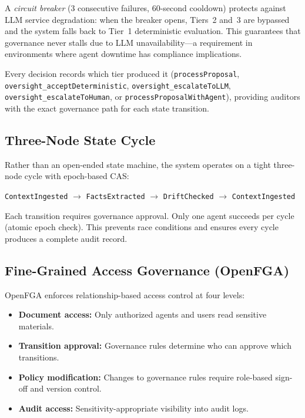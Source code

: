 \documentclass[11pt]{article}
\begin{document}
A \emph{circuit breaker} (3 consecutive failures, 60-second cooldown) protects against LLM service degradation: when the breaker opens, Tiers~2 and~3 are bypassed and the system falls back to Tier~1 deterministic evaluation. This guarantees that governance never stalls due to LLM unavailability---a requirement in environments where agent downtime has compliance implications.

Every decision records which tier produced it (\texttt{processProposal}, \texttt{oversight\_acceptDeterministic}, \texttt{oversight\_escalateToLLM}, \texttt{oversight\_escalateToHuman}, or \texttt{processProposalWithAgent}), providing auditors with the exact governance path for each state transition.

\subsection{Three-Node State Cycle}

Rather than an open-ended state machine, the system operates on a tight three-node cycle with epoch-based CAS:

\begin{center}
\texttt{ContextIngested} $\rightarrow$ \texttt{FactsExtracted} $\rightarrow$ \texttt{DriftChecked} $\rightarrow$ \texttt{ContextIngested}
\end{center}

Each transition requires governance approval. Only one agent succeeds per cycle (atomic epoch check). This prevents race conditions and ensures every cycle produces a complete audit record.

\subsection{Fine-Grained Access Governance (OpenFGA)}
\label{sec:openfga}

OpenFGA \cite{pang2019} enforces relationship-based access control at four levels:

\begin{itemize}
  \item \textbf{Document access:} Only authorized agents and users read sensitive materials.
  \item \textbf{Transition approval:} Governance rules determine who can approve which transitions.
  \item \textbf{Policy modification:} Changes to governance rules require role-based sign-off and version control.
  \item \textbf{Audit access:} Sensitivity-appropriate visibility into audit logs.
\end{itemize}
\end{document}

